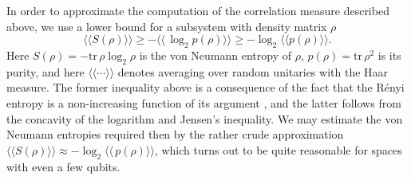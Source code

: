 \documentclass[aps,showpacs,prl,12pt]{revtex4}
\begin{document}
In order to approximate the computation of the correlation measure
described above, we use a lower bound for a subsystem with
density matrix $\rho$
\begin{equation}
\langle\!\langle S(\rho) \rangle\!\rangle
\ge -\langle\!\langle \,\log_2 p(\rho) \rangle\!\rangle
\ge -\log_2 \langle\!\langle p(\rho) \rangle\!\rangle. %
\end{equation}
Here $S(\rho)=-{\text{tr}}\, \rho \log_2 \rho$ is the von Neumann entropy
of $\rho$, $p(\rho)= {\text{tr}}\, \rho^2$ is its purity, and here
$\langle\!\langle \cdots \rangle\!\rangle$ denotes averaging over
random unitaries with the Haar measure. The former inequality above is
a consequence of the fact that the R\'enyi entropy is a non-increasing
function of its argument \cite{Bengtssonapp}, and the latter follows from the
concavity of the logarithm and Jensen's inequality. We may estimate
the von Neumann entropies required then by the rather crude
approximation
$\langle\!\langle S(\rho) \rangle\!\rangle
\approx -\log_2 \langle\!\langle \,p(\rho) \rangle\!\rangle$, 
which turns out to be quite reasonable for spaces with even a few qubits.
\end{document}
